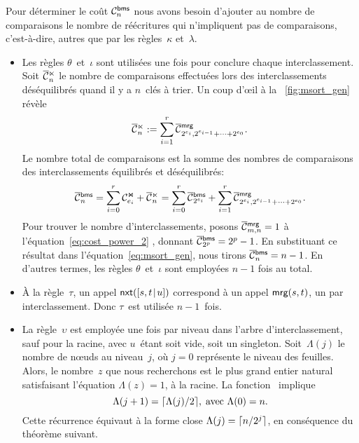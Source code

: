 Pour déterminer le coût
\(\C{\fun{bms}}{n}\) nous avons besoin
d'ajouter au nombre de comparaisons le nombre de réécritures qui
n'impliquent pas de comparaisons, c'est-à-dire, autres que par les
règles~\(\kappa\) et~\(\lambda\).
\begin{itemize}

\item Les règles \(\theta\)~et~\(\iota\) sont utilisées une fois pour
  conclure chaque interclassement. Soit
  \(\OC{\ltimes}{n}\) le nombre de
  comparaisons effectuées lors des interclassements déséquilibrés
  quand il y a \(n\)~clés à trier. Un coup d'œil à la
  \fig~\vref{fig:msort_gen} révèle
    \begin{equation}
      \OC{\ltimes}{n} :=
      \sum_{i=1}^{r}{\OC{\fun{mrg}}{2^{e_i},2^{e_{i-1}}+\dots+2^{e_0}}}.
      \label{eq:C_unbal}
    \end{equation}
    Le nombre total de comparaisons est la somme des nombres de
    comparaisons des interclassements équilibrés et déséquilibrés:
    \begin{equation}
      \OC{\fun{bms}}{n}
      = \sum_{i=0}^{r}{\C{\Join}{e_i}}
      +
      \OC{\ltimes}{n}
      = \sum_{i=0}^{r}{\OC{\fun{bms}}{2^{e_i}}}
      +
      \sum_{i=1}^{r}{\OC{\fun{mrg}}{2^{e_i},2^{e_{i-1}}+\dots+2^{e_0}}}.
      \label{eq:msort_gen}
    \end{equation}
    Pour trouver le nombre d'interclassements, posons
    \(\OC{\fun{mrg}}{m,n} = 1\) à l'équation~\eqref{eq:cost_power_2}
    , donnant \(\OC{\fun{bms}}{2^p} = 2^p -
    1\). En substituant ce résultat dans
    l'équation~\eqref{eq:msort_gen}, nous tirons \(\OC{\fun{bms}}{n} =
    n - 1\). En d'autres termes, les règles \(\theta\)~et~\(\iota\)
    sont employées \(n-1\)\label{eq:bms_merges} fois au
    total.

  \item À la règle~\(\tau\), un appel
    \(\fun{nxt}(\cons{s,t}{u})\) correspond à
    un appel \(\fun{mrg}(s,t)\), un par
    interclassement. Donc \(\tau\)~est utilisée \(n-1\)~fois.

  \item La règle~\(\upsilon\) est employée une fois par niveau dans
    l'arbre d'interclassement,
    sauf pour la racine, avec \(u\)~étant soit vide, soit un
    singleton. Soit~\(\Lambda(j)\) le nombre de nœuds au
    niveau~\(j\), où \(j=0\) représente le niveau des feuilles. Alors,
    le nombre~\(z\) que nous recherchons est le plus grand entier
    natural satisfaisant l'équation \(\Lambda(z) = 1\), à la racine.
    La fonction~ implique
    \begin{equation*}
      \Lambda(j+1) = \ceiling{\Lambda(j)/2},\; \text{avec \(\Lambda(0)
        = n\)}.
    \end{equation*}
    Cette récurrence équivaut à la forme close \(\Lambda(j) =
    \ceiling{n/2^j}\), en conséquence du théorème suivant.


\end{itemize}
